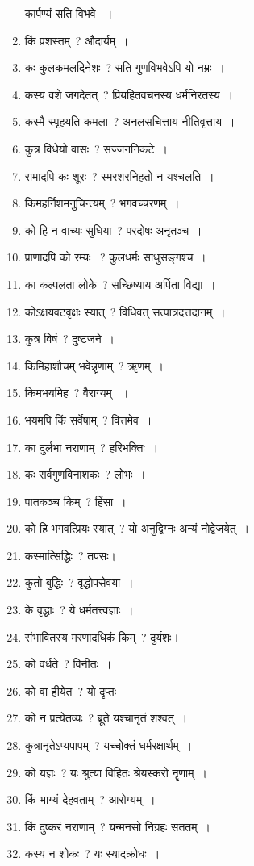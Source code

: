 \documentclass[twoside,12pt,notitlepage]{book}
\begin{document}
\begin{enumerate}
	कार्पण्यं सति विभवे ~।\footB\
	\item किं प्रशस्तम्~? औदार्यम्~।
	\item कः कुलकमलदिनेशः~? सति गुणविभवेऽपि यो नम्रः~।
	\item कस्य वशे जगदेतत्~? प्रियहितवचनस्य  धर्मनिरतस्य~।
	\item कस्मै स्पृहयति  कमला~? 
	अनलसचित्ताय नीतिवृत्ताय~।\footB\
	\item कुत्र विधेयो वासः~? सज्जननिकटे~।
	\item रामादपि कः शूरः~? 
	स्मरशरनिहतो न यश्चलति~।\footB\
	\item किमहर्निशमनुचिन्त्यम्~? भगवच्चरणम्~।
	\item को हि न वाच्यः  सुधिया~? परदोषः अनृतञ्च~।
	\item प्राणादपि को रम्यः ~? कुलधर्मः साधुसङ्गश्च~।
	\item का कल्पलता लोके~? सच्छिष्याय अर्पिता विद्या~।
	\item कोऽक्षयवटवृक्षः स्यात्~? विधिवत् सत्पात्रदत्तदानम्~।
	\item कुत्र विषं~? दुष्टजने~।
	\item किमिहाशौचम्  भवेन्नॄणाम्~? ॠणम्~।
	\item किमभयमिह~? वैराग्यम् ~।
	\item भयमपि किं सर्वेषाम्~? वित्तमेव~।
	\item का दुर्लभा नराणाम्~?  हरिभक्तिः~।
	\item कः सर्वगुणविनाशकः~? लोभः~।
	\item पातकञ्च किम्~? हिंसा~।
	\item को हि भगवत्प्रियः स्यात्~? 
	यो अनुद्विग्नः अन्यं नोद्वेजयेत्~।\footB\
	\item कस्मात्सिद्धिः~? तपसः।
	\item कुतो बुद्धिः~? वृद्धोपसेवया~।
	\item के वृद्धाः~? ये धर्मतत्त्वज्ञाः~।
	\item संभावितस्य मरणादधिकं किम्~? दुर्यशः।
	\item को वर्धते~? विनीतः~।
	\item को वा हीयेत~? यो दृप्तः~।
	\item को न प्रत्येतव्यः~? ब्रूते यश्चानृतं शश्वत्~।
	\item कुत्रानृतेऽप्यपापम्~? यच्चोक्तं धर्मरक्षार्थम्~।
	\item को यज्ञः~? यः श्रुत्या विहितः श्रेयस्करो नॄणाम्~।
	\item किं भाग्यं देहवताम्~? आरोग्यम्~।
	\item किं दुष्करं नराणाम्~? यन्मनसो निग्रहः सततम्~।
	\item कस्य न शोकः~? यः स्यादक्रोधः~।

\end{enumerate}
\end{document}
